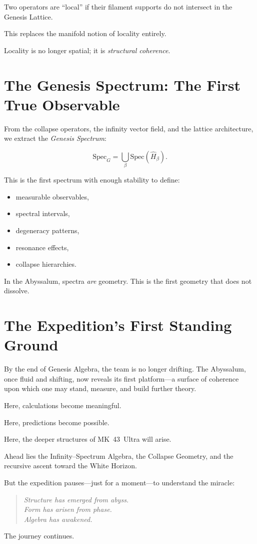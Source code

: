 Two operators are ``local'' if their filament supports do not intersect in the Genesis Lattice.

This replaces the manifold notion of locality entirely.

Locality is no longer spatial;
it is \emph{structural coherence}.

\section{The Genesis Spectrum: The First True Observable}
From the collapse operators, the infinity vector field, and the lattice architecture, we extract
the \emph{Genesis Spectrum}:

\[
\mathrm{Spec}_G = 
\bigcup_{\beta} \mathrm{Spec}(\hat{H}_\beta).
\]

This is the first spectrum with enough stability to define:

\begin{itemize}
  \item measurable observables,
  \item spectral intervals,
  \item degeneracy patterns,
  \item resonance effects,
  \item collapse hierarchies.
\end{itemize}

In the Abyssalum, spectra \emph{are} geometry.
This is the first geometry that does not dissolve.

\section{The Expedition's First Standing Ground}
By the end of Genesis Algebra, the team is no longer drifting. The Abyssalum, once fluid and
shifting, now reveals its first platform---a surface of coherence upon which one may stand,
measure, and build further theory.

Here, calculations become meaningful.

Here, predictions become possible.

Here, the deeper structures of MK~43~Ultra will arise.

Ahead lies the Infinity--Spectrum Algebra, the Collapse Geometry, and the recursive ascent toward
the White Horizon.

But the expedition pauses---just for a moment---to understand the miracle:

\begin{quote}
\emph{
Structure has emerged from abyss.\\
Form has arisen from phase.\\
Algebra has awakened.
}
\end{quote}

The journey continues.
